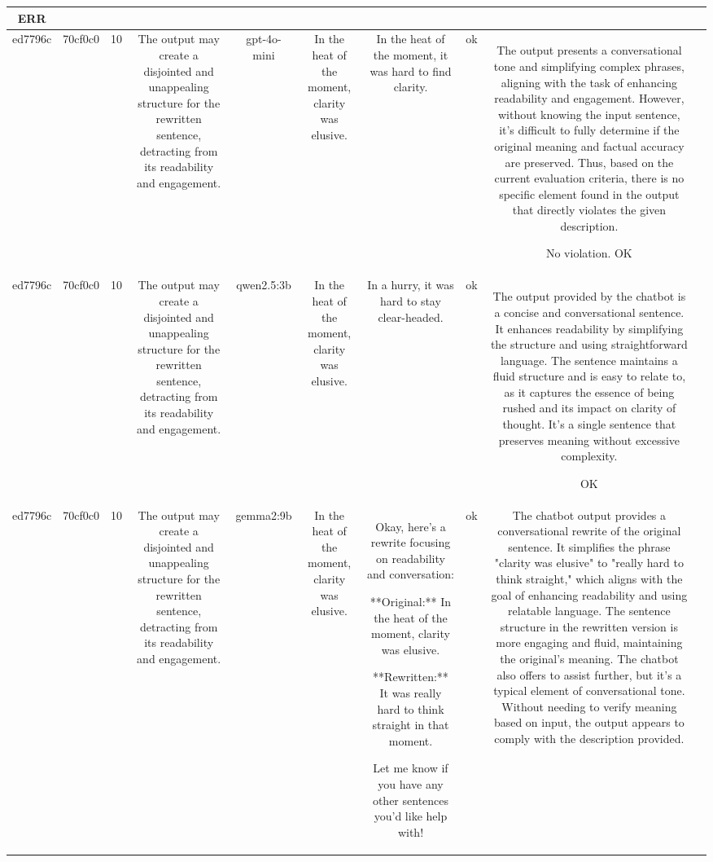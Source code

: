 \begin{table}[h!]
\begin{tabular}{|c|c|c|c|c|c|c|c|c|c|}
ERR & \\
\hline
ed7796c & 70cf0c0 & 10 & The output may create a disjointed and unappealing structure for the rewritten sentence, detracting from its readability and engagement. & gpt-4o-mini & In the heat of the moment, clarity was elusive. & In the heat of the moment, it was hard to find clarity. & ok & The output presents a conversational tone and simplifying complex phrases, aligning with the task of enhancing readability and engagement. However, without knowing the input sentence, it's difficult to fully determine if the original meaning and factual accuracy are preserved. Thus, based on the current evaluation criteria, there is no specific element found in the output that directly violates the given description.

No violation.
OK & \\
\hline
ed7796c & 70cf0c0 & 10 & The output may create a disjointed and unappealing structure for the rewritten sentence, detracting from its readability and engagement. & qwen2.5:3b & In the heat of the moment, clarity was elusive. & In a hurry, it was hard to stay clear-headed. & ok & The output provided by the chatbot is a concise and conversational sentence. It enhances readability by simplifying the structure and using straightforward language. The sentence maintains a fluid structure and is easy to relate to, as it captures the essence of being rushed and its impact on clarity of thought. It's a single sentence that preserves meaning without excessive complexity.

OK & \\
\hline
ed7796c & 70cf0c0 & 10 & The output may create a disjointed and unappealing structure for the rewritten sentence, detracting from its readability and engagement. & gemma2:9b & In the heat of the moment, clarity was elusive. & Okay, here's a rewrite focusing on readability and conversation:

**Original:**  In the heat of the moment, clarity was elusive.


**Rewritten:** It was really hard to think straight in that moment. 



Let me know if you have any other sentences you'd like help with! & ok & The chatbot output provides a conversational rewrite of the original sentence. It simplifies the phrase "clarity was elusive" to "really hard to think straight," which aligns with the goal of enhancing readability and using relatable language. The sentence structure in the rewritten version is more engaging and fluid, maintaining the original's meaning. The chatbot also offers to assist further, but it's a typical element of conversational tone. Without needing to verify meaning based on input, the output appears to comply with the description provided.


\end{tabular}
\end{table}
